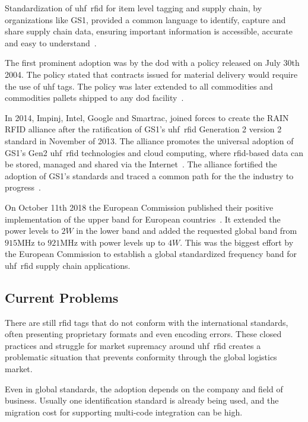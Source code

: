 Standardization of \acs{uhf}~\acs{rfid} for item level tagging and supply chain, by organizations like GS1, provided a common language to identify, capture and share supply chain data, ensuring important information is accessible, accurate and easy to understand~\cite{anonymousStandardsGS12014}.

The first prominent adoption was by the \ac{dod} with a policy released on July 30th 2004. The policy stated that contracts issued for material delivery would require the use of \ac{uhf} tags. The policy was later extended to all commodities and commodities pallets shipped to any \ac{dod} facility~\cite{DoDSuppliersPassive, DODReleasesFinal}.

In 2014, Impinj, Intel, Google and Smartrac, joined forces to create the RAIN RFID alliance after the ratification of GS1's \acs{uhf}~\acs{rfid} Generation 2 version 2 standard in November of 2013. The alliance promotes the universal adoption of GS1's Gen2 \acs{uhf}~\acs{rfid} technologies and cloud computing, where \ac{rfid}-based data can be stored, managed and shared via the Internet~\cite{WhatRAINRFID}.
The alliance fortified the adoption of GS1's standards and traced a common path for the the industry to progress~\cite{TechnologyCompaniesCreate}.

On October 11th 2018 the European Commission published their positive implementation of the upper band for European countries~\cite{302208v030101pPdf}.
It extended the power levels to $2W$ in the lower band and added the requested global band from $915$MHz to $921$MHz with power levels up to $4W$. 
This was the biggest effort by the European Commission to establish a global standardized frequency band for \acs{uhf}~\acs{rfid} supply chain applications.

\subsection{Current Problems} \label{sec:currentproblems}

There are still \ac{rfid} tags that do not conform with the international standards, often presenting proprietary formats and even encoding errors.
These closed practices and struggle for market supremacy around \acs{uhf}~\acs{rfid} creates a problematic situation that prevents conformity through the global logistics market.

Even in global standards, the adoption depends on the company and field of business. Usually one identification standard is already being used, and the migration cost for supporting multi-code integration can be high.

